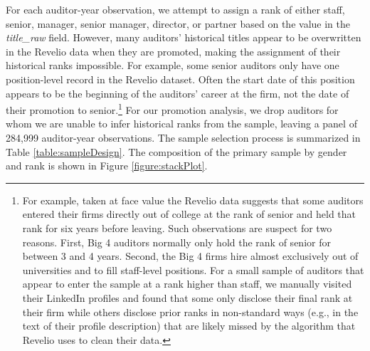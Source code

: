 \documentclass[11pt]{article}
\begin{document}
        For each auditor-year observation, we attempt to assign a rank of either staff, senior, manager, senior manager, director, or partner based on the value in the \textit{title\_raw} field. However, many auditors' historical titles appear to be overwritten in the Revelio data when they are promoted, making the assignment of their historical ranks impossible. For example, some senior auditors only have one position-level record in the Revelio dataset. Often the start date of this position appears to be the beginning of the auditors' career at the firm, not the date of their promotion to senior.\footnote{For example, taken at face value the Revelio data suggests that some auditors entered their firms directly out of college at the rank of senior and held that rank for six years before leaving. Such observations are suspect for two reasons. First, Big 4 auditors normally only hold the rank of senior for between 3 and 4 years. Second, the Big 4 firms hire almost exclusively out of universities and to fill staff-level positions. For a small sample of auditors that appear to enter the sample at a rank higher than staff, we manually visited their LinkedIn profiles and found that some only disclose their final rank at their firm while others disclose prior ranks in non-standard ways (e.g., in the text of their profile description) that are likely missed by the algorithm that Revelio uses to clean their data.} For our promotion analysis, we drop auditors for whom we are unable to infer historical ranks from the sample, leaving a panel of 284,999 auditor-year observations. The sample selection process is summarized in Table \ref{table:sampleDesign}. The composition of the primary sample by gender and rank is shown in Figure \ref{figure:stackPlot}.
        
\end{document}
